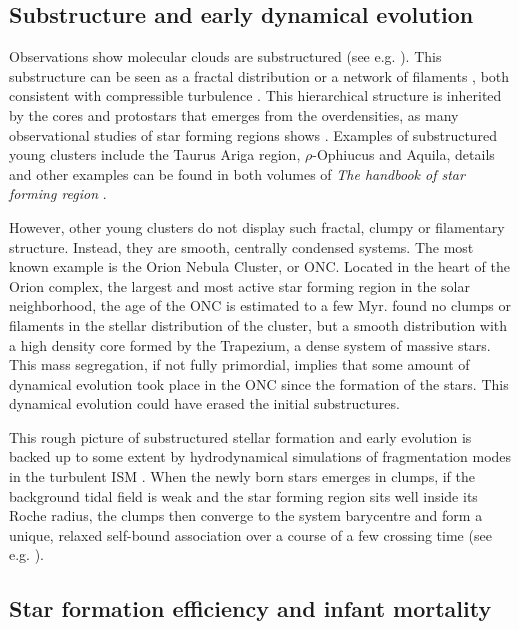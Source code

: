 \subsection{Substructure and early dynamical evolution}

Observations show molecular clouds are substructured (see e.g. \citealt{Cambresy1999}). This substructure can be seen as a fractal distribution \citep{Elmegreen1996} or a network of filaments \citep{Andre2010}, both consistent with compressible turbulence \citep{McKee2007}	. This hierarchical structure is inherited by the cores and protostars that emerges from the overdensities, as many observational studies of star forming regions shows \citep{Schneider1979,Hartmann2002,Bressert2010}. Examples of substructured young clusters include the Taurus Ariga region, $\rho$-Ophiucus and Aquila, details and other examples can be found in both volumes of \textit{The handbook of star forming region} \cite{Reipurth2008}.  

However, other young clusters do not display such fractal, clumpy or filamentary structure. Instead, they are smooth, centrally condensed systems. The most known example is the Orion Nebula Cluster, or ONC. Located in the heart of the Orion complex, the largest and most active star forming region in the solar neighborhood, the age of the ONC is estimated to a few Myr. \cite{Hillenbrand1998} found no clumps or filaments in the stellar distribution of the cluster, but a smooth distribution with a high density core formed by the Trapezium, a dense system of massive stars. This mass segregation, if not fully primordial, implies that some amount of dynamical evolution took place in the ONC since the formation of the stars. This dynamical evolution could have erased the initial substructures.

This rough picture of substructured stellar formation and early evolution is backed up to some extent by hydrodynamical simulations of fragmentation modes in the turbulent ISM \citep{Klessen2000,Bate2003,MacLow2004,Offner2009}. When the newly born stars emerges in clumps, if the background tidal field is weak and the star forming region sits well inside its Roche radius, the clumps then converge to the system barycentre  and form a unique, relaxed  self-bound association over a  course of a few crossing time (see e.g. \citealt{Allison2009,Maschberger2010,Fujii2012}).


\subsection{Star formation efficiency and infant mortality}

